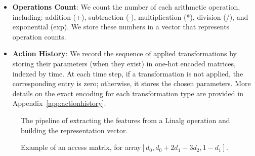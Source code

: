 \documentclass[10pt,twocolumn]{article}
\begin{document}
\begin{itemize}
\item \textbf{Operations Count}: We count the number of each arithmetic operation, including: addition (+), subtraction (-), multiplication (*), division (/), and exponential (exp). We store these numbers in a vector that represents operation counts.
\item \textbf{Action History}: We record the sequence of applied transformations by storing their parameters (when they exist) in one-hot encoded matrices, indexed by time. At each time step, if a transformation is not applied, the corresponding entry is zero; otherwise, it stores the chosen parameters. More details on the exact encoding for each transformation type are provided in Appendix~\ref{app:actionhistory}.
\end{itemize}

\begin{figure}[t]
\centering
{}
\caption{The pipeline of extracting the features from a Linalg operation and building the representation vector.}
\label{fig:pipeline}
\end{figure}

\begin{figure}[t]
\centering
{}
\caption{Example of an access matrix, for array$[d_0, d_0 + 2 d_1 - 3 d_2, 1 - d_1]$.}
\label{fig:accessmatrix}
\end{figure}
\end{document}
